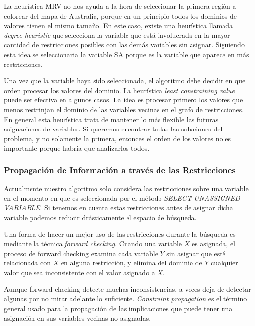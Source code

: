 La heur\'istica MRV no nos ayuda a la hora de seleccionar la primera regi\'on a colorear del mapa de Australia, porque en un principio todos los dominios de valores tienen el mismo tamaño. En este caso, existe una heur\'istica llamada \emph{degree heuristic} que selecciona la variable que est\'a involucrada en la mayor cantidad de restricciones posibles con las dem\'as variables sin asignar. Siguiendo esta idea se seleccionaria la variable SA porque es la variable que aparece en m\'as restricciones.

Una vez que la variable haya sido seleccionada, el algoritmo debe decidir en que orden procesar los valores del dominio. La heur\'istica \emph{least constraining value} puede ser efectiva en algunos casos. La idea es procesar primero los valores que menos restrinjan el dominio de las variables vecinas en el grafo de restricciones. En general esta heur\'istica trata de mantener lo m\'as flexible las futuras asignaciones de variables. Si queremos encontrar todas las soluciones del problema, y no solamente la primera, entonces el orden de los valores no es importante porque habr\'ia que analizarlos todos.

\subsubsection{Propagaci\'on de Informaci\'on a trav\'es de las Restricciones}

Actualmente nuestro algoritmo solo considera las restricciones sobre una variable en el momento en que es seleccionada por el m\'etodo \emph{SELECT-UNASSIGNED-VARIABLE}. Si tenemos en cuenta estas restricciones antes de asignar dicha variable podemos reducir dr\'asticamente el espacio de b\'usqueda.

Una forma de hacer un mejor uso de las restricciones durante la b\'usqueda es mediante la t\'ecnica \emph{forward checking}. Cuando una variable $X$ es asignada, el proceso de forward checking examina cada variable $Y$ sin asignar que est\'e relacionada con $X$ en alguna restricci\'on, y elimina del dominio de $Y$ cualquier valor que sea inconsistente con el valor asignado a $X$.

Aunque forward checking detecte muchas inconsistencias, a veces deja de detectar algunas por no mirar adelante lo suficiente. \emph{Constraint propagation} es el t\'ermino general usado para la propagaci\'on de las implicaciones que puede tener una asignaci\'on en sus variables vecinas no asignadas.

